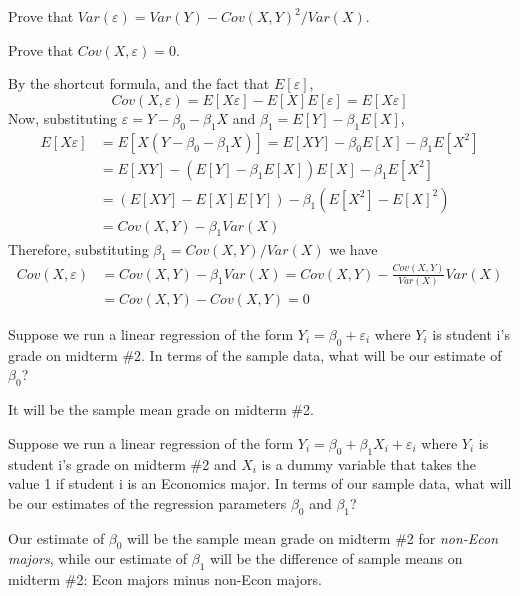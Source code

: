 \documentclass[addpoints,12pt]{exam}
\begin{document}
\begin{questions}
\question Prove that $Var(\varepsilon) = Var(Y) - Cov(X,Y)^2/Var(X)$.
\begin{solution}

\end{solution}

\question Prove that $Cov(X,\varepsilon) = 0$.
\begin{solution}
  By the shortcut formula, and the fact that $E[\varepsilon]$,
  \[
    Cov(X, \varepsilon) = E[X\varepsilon] - E[X]E[\varepsilon] = E[X\varepsilon]
  \]
  Now, substituting $\varepsilon = Y - \beta_0 - \beta_1 X$ and $\beta_1 = E[Y] - \beta_1 E[X]$, 
  \begin{align*}
    E[X\varepsilon] &= E[X(Y - \beta_0 - \beta_1 X)] = E[XY] - \beta_0 E[X] - \beta_1 E[X^2] \\
    &= E[XY] - \left(E[Y] - \beta_1 E[X]\right)E[X] - \beta_1 E[X^2]\\
    &= \left( E[XY] - E[X]E[Y] \right) - \beta_1 \left( E[X^2] - E[X]^2 \right)\\
    &= Cov(X,Y) - \beta_1 Var(X)
  \end{align*}
  Therefore, substituting $\beta_1 = Cov(X,Y)/Var(X)$ we have
  \begin{align*}
    Cov(X,\varepsilon) &= Cov(X,Y) - \beta_1 Var(X) = Cov(X,Y) - \frac{Cov(X,Y)}{Var(X)} Var(X)\\
    &= Cov(X,Y) - Cov(X,Y) = 0
  \end{align*}
\end{solution}


\question Suppose we run a linear regression of the form $Y_i = \beta_0 + \varepsilon_i$ where $Y_i$ is student i's grade on midterm \#2. In terms of the sample data, what will be our estimate of $\beta_0$?
\begin{solution}
  It will be the sample mean grade on midterm \#2.
\end{solution}

\question Suppose we run a linear regression of the form $Y_i = \beta_0 + \beta_1 X_i + \varepsilon_i$ where $Y_i$ is student i's grade on midterm \#2 and $X_i$ is a dummy variable that takes the value 1 if student i is an Economics major. In terms of our sample data, what will be our estimates of the regression parameters $\beta_0$ and $\beta_1$?
\begin{solution}
  Our estimate of $\beta_0$ will be the sample mean grade on midterm \#2 for \emph{non-Econ majors}, while our estimate of $\beta_1$ will be the difference of sample means on midterm \#2: Econ majors minus non-Econ majors.
\end{solution}



\end{questions}
\end{document}
